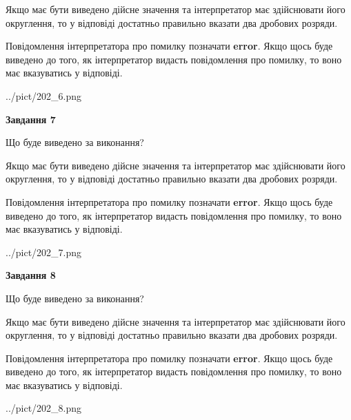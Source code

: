\documentclass[12pt, ukrainian]{article}
\begin{document}
{\begin {Large}
Якщо має бути виведено дійсне значення та інтерпретатор має здійснювати його округлення, 
то у відповіді достатньо правильно вказати два дробових розряди.

Повідомлення інтерпретатора про помилку позначати \textbf{error}.
Якщо щось буде виведено до того, як інтерпретатор видасть повідомлення про помилку, 
то воно має вказуватись у відповіді. \par

\begin{center}
	{../pict/202_6.png}
\end{center}
\newpage

{\begin {center}\textbf{Завдання 7}\end {center}}\par
Що буде виведено за виконання? \par

Якщо має бути виведено дійсне значення та інтерпретатор має здійснювати його округлення, 
то у відповіді достатньо правильно вказати два дробових розряди.

Повідомлення інтерпретатора про помилку позначати \textbf{error}.
Якщо щось буде виведено до того, як інтерпретатор видасть повідомлення про помилку, 
то воно має вказуватись у відповіді. \par

\begin{center}
	{../pict/202_7.png}
\end{center}
\newpage

{\begin {center}\textbf{Завдання 8}\end {center}}\par
Що буде виведено за виконання? \par

Якщо має бути виведено дійсне значення та інтерпретатор має здійснювати його округлення, 
то у відповіді достатньо правильно вказати два дробових розряди.

Повідомлення інтерпретатора про помилку позначати \textbf{error}.
Якщо щось буде виведено до того, як інтерпретатор видасть повідомлення про помилку, 
то воно має вказуватись у відповіді. \par

\begin{center}
	{../pict/202_8.png}
\end{center}
\newpage


\end{Large}}
\end{document}
